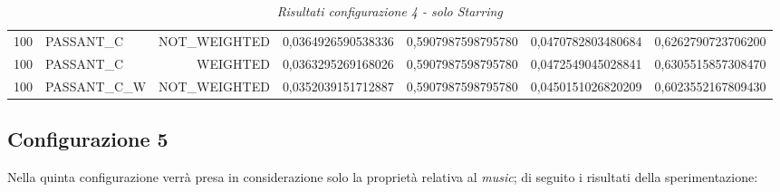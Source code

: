 \begin{table}[H]
{\begin{tabular}{ c l r c c c c }
				100 &  PASSANT\_C & NOT\_WEIGHTED & 0,0364926590538336 & 0,5907987598795780 & 0,0470782803480684 & 0,6262790723706200 \\
				
				100 &  PASSANT\_C &   WEIGHTED & 0,0363295269168026 & 0,5907987598795780 & 0,0472549045028841 & 0,6305515857308470 \\
				
				100 & PASSANT\_C\_W & NOT\_WEIGHTED & 0,0352039151712887 & 0,5907987598795780 & 0,0450151026820209 & 0,6023552167809430 \\
			\bottomrule
		\end{tabular}  
	}
	\caption{\emph{Risultati configurazione 4 - solo Starring}}
\end{table}


\subsection{Configurazione 5}
Nella quinta configurazione verrà presa in considerazione solo la proprietà relativa al \emph{music}; di seguito i risultati della sperimentazione:
	
